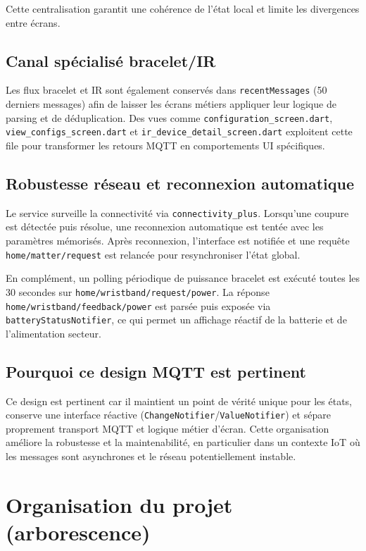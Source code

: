 \documentclass[12pt,a4paper]{report}
\begin{document}
Cette centralisation garantit une cohérence de l’état local et limite les divergences entre écrans.

\section{Canal spécialisé bracelet/IR}
Les flux bracelet et IR sont également conservés dans \texttt{recentMessages} (50 derniers messages) afin de laisser les écrans métiers appliquer leur logique de parsing et de déduplication. Des vues comme \texttt{configuration\_screen.dart}, \texttt{view\_configs\_screen.dart} et \texttt{ir\_device\_detail\_screen.dart} exploitent cette file pour transformer les retours MQTT en comportements UI spécifiques.

\section{Robustesse réseau et reconnexion automatique}
Le service surveille la connectivité via \texttt{connectivity\_plus}. Lorsqu’une coupure est détectée puis résolue, une reconnexion automatique est tentée avec les paramètres mémorisés. Après reconnexion, l’interface est notifiée et une requête \texttt{home/matter/request} est relancée pour resynchroniser l’état global.

En complément, un polling périodique de puissance bracelet est exécuté toutes les 30 secondes sur \texttt{home/wristband/request/power}. La réponse \texttt{home/wristband/feedback/power} est parsée puis exposée via \texttt{batteryStatusNotifier}, ce qui permet un affichage réactif de la batterie et de l’alimentation secteur.

\section{Pourquoi ce design MQTT est pertinent}
Ce design est pertinent car il maintient un point de vérité unique pour les états, conserve une interface réactive (\texttt{ChangeNotifier}/\texttt{ValueNotifier}) et sépare proprement transport MQTT et logique métier d’écran. Cette organisation améliore la robustesse et la maintenabilité, en particulier dans un contexte IoT où les messages sont asynchrones et le réseau potentiellement instable.

\chapter{Organisation du projet (arborescence)}
\end{document}
